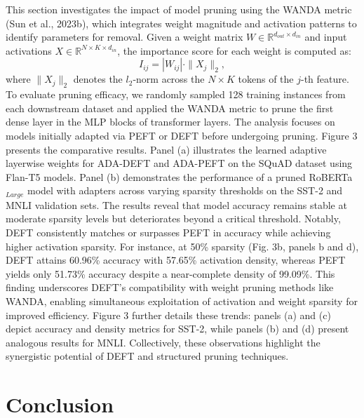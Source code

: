\documentclass[10pt,twocolumn]{article}
\begin{document}
This section investigates the impact of model pruning using the WANDA metric (Sun et al., 2023b), which integrates weight magnitude and activation patterns to identify parameters for removal. Given a weight matrix \(W \in \mathbb{R}^{d_{out} \times d_{in}}\) and input activations \(X \in \mathbb{R}^{N \times K \times d_{in}}\), the importance score for each weight is computed as:
\[I_{i j} = |W_{i j}| \cdot \|X_{j}\|_{2},\]
where \(\|X_{j}\|_{2}\) denotes the \(l_{2}\)-norm across the \(N \times K\) tokens of the \(j\)-th feature. To evaluate pruning efficacy, we randomly sampled 128 training instances from each downstream dataset and applied the WANDA metric to prune the first dense layer in the MLP blocks of transformer layers. The analysis focuses on models initially adapted via PEFT or DEFT before undergoing pruning. Figure 3 presents the comparative results. Panel (a) illustrates the learned adaptive layerwise weights for ADA-DEFT and ADA-PEFT on the SQuAD dataset using Flan-T5 models. Panel (b) demonstrates the performance of a pruned RoBERTa\(_{Large}\) model with adapters across varying sparsity thresholds on the SST-2 and MNLI validation sets. The results reveal that model accuracy remains stable at moderate sparsity levels but deteriorates beyond a critical threshold. Notably, DEFT consistently matches or surpasses PEFT in accuracy while achieving higher activation sparsity. For instance, at 50\% sparsity (Fig. 3b, panels b and d), DEFT attains 60.96\% accuracy with 57.65\% activation density, whereas PEFT yields only 51.73\% accuracy despite a near-complete density of 99.09\%. This finding underscores DEFT’s compatibility with weight pruning methods like WANDA, enabling simultaneous exploitation of activation and weight sparsity for improved efficiency. Figure 3 further details these trends: panels (a) and (c) depict accuracy and density metrics for SST-2, while panels (b) and (d) present analogous results for MNLI. Collectively, these observations highlight the synergistic potential of DEFT and structured pruning techniques.




\section{Conclusion}
\end{document}
